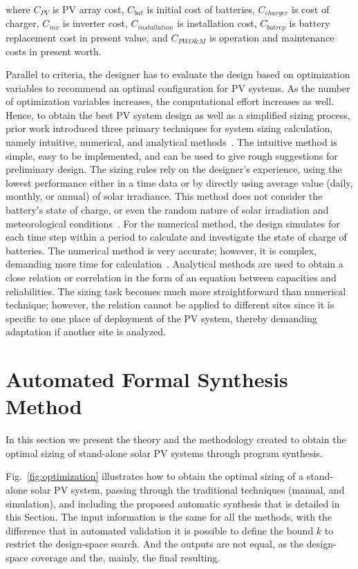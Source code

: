 \documentclass[journal]{IEEEtran}
\begin{document}
\noindent where $C_{PV}$ is PV array cost, $C_{bat}$ is initial cost of batteries, $C_{charger}$ is cost of charger, $C_{inv}$ is inverter cost, $C_{installation}$ is installation cost, $C_{batrep}$ is battery replacement cost in present value, and $C_{PWO\&M}$ is operation and maintenance costs 
in present worth.

Parallel to criteria, the designer has to evaluate the design based on optimization variables to recommend an optimal configuration for PV systems. As the number of optimization variables increases, the computational effort increases as well. Hence, to obtain the best PV system design as well as a simplified sizing process, prior work introduced three primary techniques for system sizing calculation, namely intuitive, numerical, and analytical methods~\cite{Zhou2010}. The intuitive method is simple, easy to be implemented, and can be used to give rough suggestions for preliminary design. The sizing rules rely on the designer's experience, using the lowest performance either in a time data or by directly using average value (daily, monthly, or annual) of solar irradiance. This method does not consider the battery's state of charge, or even the random nature of solar irradiation and meteorological conditions~\cite{Alsadi2018}. For the numerical method, the design simulates for each time step within a period to calculate and investigate the state of charge of batteries. The numerical method is very accurate; however, it is complex, demanding more time for calculation~\cite{Park2004}. Analytical methods are used to obtain a close relation or correlation in the form of an equation between capacities and reliabilities. The sizing task becomes much more straightforward than numerical technique; however, the relation cannot be applied to different sites since it is specific to one place of deployment of the PV system, thereby demanding adaptation if another site is analyzed.

\section{Automated Formal Synthesis Method}
\label{sec:Method}

In this section we present the theory and the methodology created to obtain the optimal sizing of stand-alone solar PV systems through program synthesis.

Fig.~\ref{fig:optimization} illustrates how to obtain the optimal sizing of a stand-alone solar PV system, passing through the traditional techniques (manual, and simulation), and including the proposed automatic synthesis that is detailed in this Section. The input information is the same for all the methods, with the difference that in automated validation it is possible to define the bound $k$ to restrict the design-space search. And the outputs are not equal, as the design-space coverage and the, mainly, the final resulting.
\end{document}
